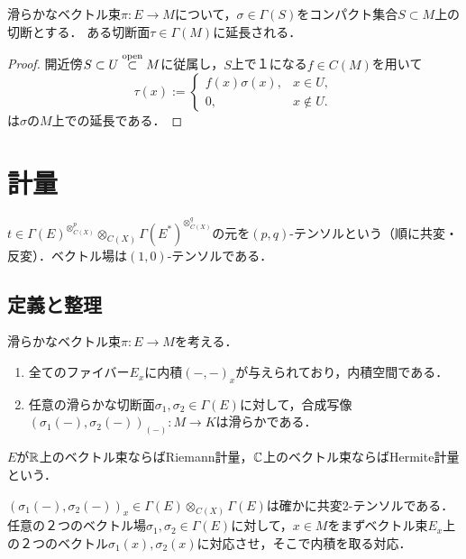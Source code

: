 \documentclass[uplatex,dvipdfmx]{jsreport}
\begin{document}
\begin{proposition}[切断の延長]
    滑らかなベクトル束$\pi:E\to M$について，$\sigma\in\Gamma(S)$をコンパクト集合$S\subset M$上の切断とする．
    ある切断面$\tau\in\Gamma(M)$に延長される．
\end{proposition}
\begin{proof}
    開近傍$S\subset U\overset{\mathrm{open}}{\subset} M$に従属し，$S$上で１になる$f\in C(M)$を用いて
    \[\tau(x):=\begin{cases}
        f(x)\sigma(x),&x\in U,\\
        0,&x\notin U.
    \end{cases}\]
    は$\sigma$の$M$上での延長である．
\end{proof}

\section{計量}

\begin{tcolorbox}[colframe=ForestGreen, colback=ForestGreen!10!white,breakable,colbacktitle=ForestGreen!40!white,coltitle=black,fonttitle=\bfseries\sffamily,
title=]
    $t\in\Gamma(E)^{\otimes^p_{C(X)}}\otimes_{C(X)}\Gamma(E^*)^{\otimes^q_{C(X)}}$の元を$(p,q)$-テンソルという（順に共変・反変）．ベクトル場は$(1,0)$-テンソルである．
\end{tcolorbox}

\subsection{定義と整理}

\begin{definition}[metric]\label{def-metric}
    滑らかなベクトル束$\pi:E\to M$を考える．
    \begin{enumerate}
        \item 全てのファイバー$E_x$に内積$(-,-)_x$が与えられており，内積空間である．
        \item 任意の滑らかな切断面$\sigma_1,\sigma_2\in\Gamma(E)$に対して，合成写像$(\sigma_1(-),\sigma_2(-))_{(-)}:M\to K$は滑らかである．
    \end{enumerate}
    $E$が$\mathbb{R}$上のベクトル束ならばRiemann計量，$\mathbb{C}$上のベクトル束ならばHermite計量という．
\end{definition}
\begin{remarks}
    $(\sigma_1(-),\sigma_2(-))_x\in\Gamma(E)\otimes_{C(X)}\Gamma(E)$は確かに共変2-テンソルである．
    任意の２つのベクトル場$\sigma_1,\sigma_2\in\Gamma(E)$に対して，$x\in M$をまずベクトル束$E_x$上の２つのベクトル$\sigma_1(x),\sigma_2(x)$に対応させ，そこで内積を取る対応．
\end{remarks}
\end{document}
